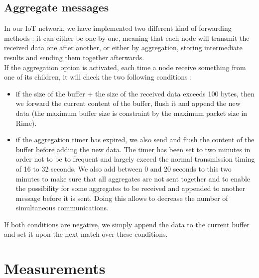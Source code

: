 \documentclass{article}
\begin{document}
\subsection{Aggregate messages}

In our IoT network, we have implemented two different kind of forwarding methods : it can either be one-by-one, meaning that each node will transmit the received data one after another, or either by aggregation, storing intermediate results and sending them together afterwards.\\
If the aggregation option is activated, each time a node receive something from one of its children, it will check the two following conditions :
\begin{itemize}
    \item if the size of the buffer + the size of the received data exceeds 100 bytes, then we forward the current content of the buffer, flush it and append the new data (the maximum buffer size is constraint by the maximum packet size in Rime).
    \item if the aggregation timer has expired, we also send and flush the content of the buffer before adding the new data. The timer has been set to two minutes in order not to be to frequent and largely exceed the normal transmission timing of 16 to 32 seconds. We also add between 0 and 20 seconds to this two minutes to make sure that all aggregates are not sent together and to enable the possibility for some aggregates to be received and appended to another message before it is sent. Doing this allows to decrease the number of simultaneous communications.
\end{itemize}
 If both conditions are negative, we simply append the data to the current buffer and set it upon the next match over these conditions.

\section{Measurements}
\end{document}
